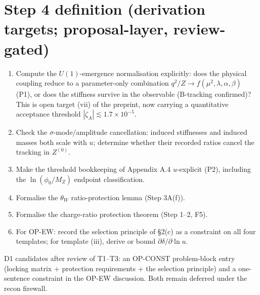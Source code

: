 \documentclass[11pt,a4paper]{article}
\begin{document}
\section{Step 4 definition (derivation targets; proposal-layer, review-gated)}
\begin{enumerate}[leftmargin=1.9em,itemsep=2pt,label=\textbf{T\arabic*.}]
\item Compute the $U(1)$-emergence normalisation explicitly: does the physical
coupling reduce to a parameter-only combination $q^2/Z\to f(\mu^2,\lambda,
\alpha,\beta)$ (P1), or does the stiffness survive in the observable (B-tracking
confirmed)? This is open target (vii) of the preprint, now carrying a quantitative
acceptance threshold $|\zeta_A|\lesssim1.7\times10^{-5}$.
\item Check the $\sigma$-mode/amplitude cancellation: induced stiffnesses and
induced masses both scale with $u$; determine whether their recorded ratios cancel
the tracking in $Z^{(0)}$.
\item Make the threshold bookkeeping of Appendix A.4 $u$-explicit (P2), including
the $\ln(\phi_0/M_Z)$ endpoint classification.
\item Formalise the $\theta_W$ ratio-protection lemma (Step 3A(f)).
\item Formalise the charge-ratio protection theorem (Step 1--2, F5).
\item For OP-EW: record the selection principle of \S2(c) as a constraint on all
four templates; for template (iii), derive or bound
$\partial\delta/\partial\ln u$.
\end{enumerate}
D1 candidates after review of T1--T3: an OP-CONST problem-block entry (locking
matrix + protection requirements + the selection principle) and a one-sentence
constraint in the OP-EW discussion. Both remain deferred under the recon firewall.
\end{document}
